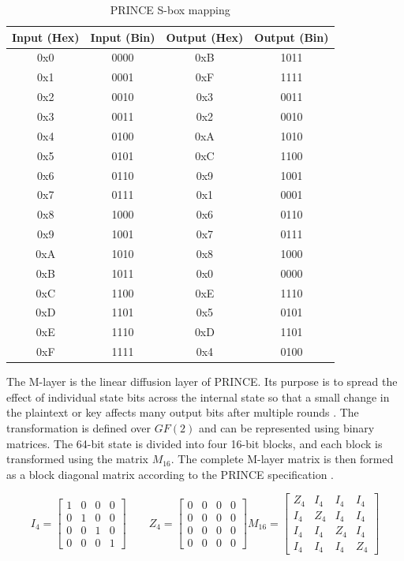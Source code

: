 \documentclass[11pt,a4paper]{article}
\begin{document}
\begin{table}[H]
\centering
\caption{PRINCE S-box mapping \cite{borghoff2012prince}}
\label{tab:classical_prince_sbox}
\begin{tabular}{|c|c|c|c|}
\hline
\textbf{Input (Hex)} & \textbf{Input (Bin)} & \textbf{Output (Hex)} & \textbf{Output (Bin)} \\
\hline
0x0 & 0000 & 0xB & 1011 \\
\hline
0x1 & 0001 & 0xF & 1111 \\
\hline
0x2 & 0010 & 0x3 & 0011 \\
\hline
0x3 & 0011 & 0x2 & 0010 \\
\hline
0x4 & 0100 & 0xA & 1010 \\
\hline
0x5 & 0101 & 0xC & 1100 \\
\hline
0x6 & 0110 & 0x9 & 1001 \\
\hline
0x7 & 0111 & 0x1 & 0001 \\
\hline
0x8 & 1000 & 0x6 & 0110 \\
\hline
0x9 & 1001 & 0x7 & 0111 \\
\hline
0xA & 1010 & 0x8 & 1000 \\
\hline
0xB & 1011 & 0x0 & 0000 \\
\hline
0xC & 1100 & 0xE & 1110 \\
\hline
0xD & 1101 & 0x5 & 0101 \\
\hline
0xE & 1110 & 0xD & 1101 \\
\hline
0xF & 1111 & 0x4 & 0100 \\
\hline
\end{tabular}
\end{table}

The M-layer is the linear diffusion layer of PRINCE. Its purpose is to spread the effect of individual state bits across the internal state so that a small change in the plaintext or key affects many output bits after multiple rounds \cite{borghoff2012prince}. The transformation is defined over $GF(2)$ and can be represented using binary matrices. The 64-bit state is divided into four 16-bit blocks, and each block is transformed using the matrix $M_{16}$. The complete M-layer matrix is then formed as a block diagonal matrix according to the PRINCE specification \cite{borghoff2012prince}.

\[
I_4 =
\begin{bmatrix}
1 & 0 & 0 & 0 \\
0 & 1 & 0 & 0 \\
0 & 0 & 1 & 0 \\
0 & 0 & 0 & 1
\end{bmatrix}
\qquad
Z_4 =
\begin{bmatrix}
0 & 0 & 0 & 0 \\
0 & 0 & 0 & 0 \\
0 & 0 & 0 & 0 \\
0 & 0 & 0 & 0
\end{bmatrix}
M_{16} =
\begin{bmatrix}
Z_4 & I_4 & I_4 & I_4 \\
I_4 & Z_4 & I_4 & I_4 \\
I_4 & I_4 & Z_4 & I_4 \\
I_4 & I_4 & I_4 & Z_4
\end{bmatrix}
\]
\end{document}
